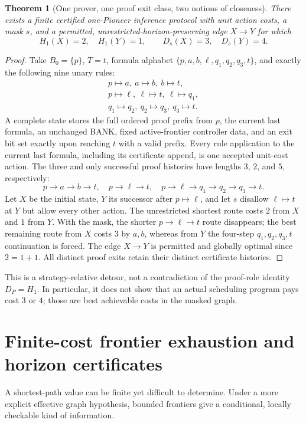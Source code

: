 \documentclass[11pt,letterpaper]{article}
\newtheorem{theorem}{Theorem}[section]
\theoremstyle{definition}
\theoremstyle{remark}
\newcommand{\Hone}{H_{1}}
\newcommand{\Dst}{D_{s}}
\begin{document}
\begin{theorem}[One prover, one proof exit class, two notions of closeness]\label{thm:B_detour}
There exists a finite certified one-Pioneer inference protocol with unit action costs, a mask $s$, and a permitted, unrestricted-horizon-preserving edge $X\to Y$ for which
\[
 \Hone(X)=2,\quad \Hone(Y)=1,\qquad \Dst(X)=3,\quad\Dst(Y)=4.
\]
\end{theorem}
\begin{proof}
Take $B_0=\{p\}$, $T=t$, formula alphabet $\{p,a,b,\ell,q_1,q_2,q_3,t\}$, and exactly the following nine unary rules:
\[
\begin{gathered}
 p\mapsto a,\ a\mapsto b,\ b\mapsto t,\\
 p\mapsto\ell,\ \ell\mapsto t,\ \ell\mapsto q_1,\\
 q_1\mapsto q_2,\ q_2\mapsto q_3,\ q_3\mapsto t.
\end{gathered}
\]
A complete state stores the full ordered proof prefix from $p$, the current last formula, an unchanged BANK, fixed active-frontier controller data, and an exit bit set exactly upon reaching $t$ with a valid prefix. Every rule application to the current last formula, including its certificate append, is one accepted unit-cost action. The three and only successful proof histories have lengths $3$, $2$, and $5$, respectively:
\[
 p\to a\to b\to t,\quad p\to\ell\to t,\quad p\to\ell\to q_1\to q_2\to q_3\to t.
\]
Let $X$ be the initial state, $Y$ its successor after $p\mapsto\ell$, and let $s$ disallow $\ell\mapsto t$ at $Y$ but allow every other action. The unrestricted shortest route costs $2$ from $X$ and $1$ from $Y$. With the mask, the shorter $p\to\ell\to t$ route disappears; the best remaining route from $X$ costs $3$ by $a,b$, whereas from $Y$ the four-step $q_1,q_2,q_3,t$ continuation is forced. The edge $X\to Y$ is permitted and globally optimal since $2=1+1$. All distinct proof exits retain their distinct certificate histories.
\end{proof}

This is a strategy-relative detour, not a contradiction of the proof-role identity $D_P=\Hone$. In particular, it does not show that an actual scheduling program pays cost $3$ or $4$; those are best achievable costs in the masked graph.

\section{Finite-cost frontier exhaustion and horizon certificates}
A shortest-path value can be finite yet difficult to determine. Under a more explicit effective graph hypothesis, bounded frontiers give a conditional, locally checkable kind of information.
\end{document}
